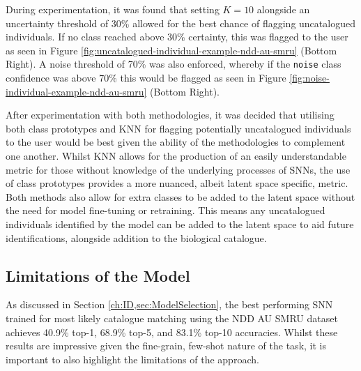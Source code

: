 During experimentation, it was found that setting $K = 10$ alongside an uncertainty threshold of 30\% allowed for the best chance of flagging uncatalogued individuals. If no class reached above 30\% certainty, this was flagged to the user as seen in Figure \ref{fig:uncatalogued-individual-example-ndd-au-smru} (Bottom Right). A noise threshold of 70\% was also enforced, whereby if the \texttt{noise} class confidence was above 70\% this would be flagged as seen in Figure \ref{fig:noise-individual-example-ndd-au-smru} (Bottom Right).

After experimentation with both methodologies, it was decided that utilising both class prototypes and KNN for flagging potentially uncatalogued individuals to the user would be best given the ability of the methodologies to complement one another. Whilst KNN allows for the production of an easily understandable metric for those without knowledge of the underlying processes of SNNs, the use of class prototypes provides a more nuanced, albeit latent space specific, metric. Both methods also allow for extra classes to be added to the latent space without the need for model fine-tuning or retraining. This means any uncatalogued individuals identified by the model can be added to the latent space to aid future identifications, alongside addition to the biological catalogue.

\subsection{Limitations of the Model}\label{ch:ID,sec:ModelSelection,sub:limitations}

As discussed in Section \ref{ch:ID,sec:ModelSelection}, the best performing SNN trained for most likely catalogue matching using the NDD AU SMRU dataset achieves 40.9\% top-1, 68.9\% top-5, and 83.1\% top-10 accuracies. Whilst these results are impressive given the fine-grain, few-shot nature of the task, it is important to also highlight the limitations of the approach. 

